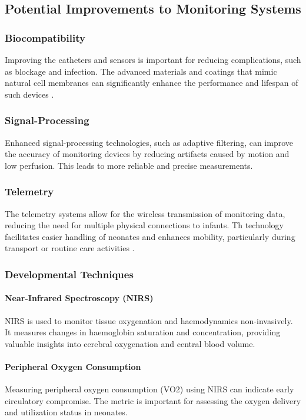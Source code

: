 \documentclass[12pt,journal,compsoc]{IEEEtran}
\begin{document}
\subsection{Potential Improvements to Monitoring Systems}

\subsubsection{Biocompatibility}
Improving the catheters and sensors is important for reducing complications, such as blockage and infection. The advanced materials and coatings that mimic natural cell membranes can significantly enhance the performance and lifespan of such devices \cite{IEEEhowto:nicklin}.

\subsubsection{Signal-Processing}
Enhanced signal-processing technologies, such as adaptive filtering, can improve the accuracy of monitoring devices by reducing artifacts caused by motion and low perfusion. This leads to more reliable and precise measurements.

\subsubsection{Telemetry}
The telemetry systems allow for the wireless transmission of monitoring data, reducing the need for multiple physical connections to infants. Th technology facilitates easier handling of neonates and enhances mobility, particularly during transport or routine care activities \cite{IEEEhowto:nicklin}.

\subsubsection{Developmental Techniques}

\paragraph{Near-Infrared Spectroscopy (NIRS)}
NIRS is used to monitor tissue oxygenation and haemodynamics non-invasively. It measures changes in haemoglobin saturation and concentration, providing valuable insights into cerebral oxygenation and central blood volume. 

\paragraph{Peripheral Oxygen Consumption}
Measuring peripheral oxygen consumption (VO2) using NIRS can indicate early circulatory compromise. The metric is important for assessing the oxygen delivery and utilization status in neonates.
\end{document}
